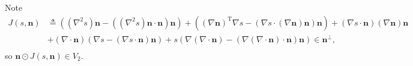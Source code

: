 \documentclass[10pt, a4paper]{article}
\newcommand\n{\mathbf{n}}
\begin{document}
\begin{appendices}
Note
\begin{equation}
\begin{aligned}
J(s, \n) & \triangleq   \left( (\nabla^2 s) \n - ((\nabla^2 s) \n \cdot \n) \n \right) + \left( (\nabla \n)^{\mathrm{T}} \nabla s - (\nabla s \cdot (\nabla \n) \n) \n \right) + (\nabla s \cdot \n)  (\nabla \n) \n  \\
    & + (\nabla \cdot \n) \left( \nabla s - (\nabla s \cdot \n) \n \right) + s \left( \nabla (\nabla \cdot \n) -  \left( \nabla (\nabla \cdot \n) \cdot \n \right) \n \right) \in \n^{\perp}, \\
\end{aligned}
\end{equation}
so $\n \odot J(s, \n)  \in V_2$.


\end{appendices}


\end{document}
